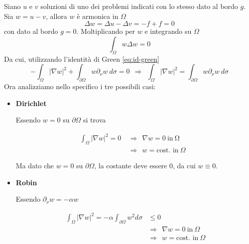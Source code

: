 \documentclass[10pt,a4paper,twoside,openright]{book}
\begin{document}
\begin{dimostrazione}
	Siano $\displaystyle u$ e $\displaystyle v$ soluzioni di uno dei problemi indicati con lo stesso dato al bordo $\displaystyle g$. Sia $\displaystyle w=u-v$, allora $\displaystyle w$ è armonica in $\displaystyle \Omega $
	\begin{equation*}
		\Delta w=\Delta u-\Delta v=-f+f=0
	\end{equation*}
	con dato al bordo $\displaystyle g=0$. Moltiplicando per $\displaystyle w$ e integrando su $\displaystyle \Omega $
	\begin{equation*}
		\int _{\Omega } w\Delta w=0
	\end{equation*}
	Da cui, utilizzando l'identità di Green \eqref{eq:id-green}
	\begin{equation*}
		-\int _{\Omega }| \nabla w| ^{2} +\int _{\partial \Omega } w\partial _{\nu } w\ d\sigma =0\ \ \Rightarrow \ \ \int _{\Omega }| \nabla w| ^{2} =\int _{\partial \Omega } w\partial _{\nu } w\ d\sigma 
	\end{equation*}
	Ora analizziamo nello specifico i tre possibili casi:
	\begin{itemize}
		\item \textbf{Dirichlet}
		      
		      Essendo $\displaystyle w=0$ su $\displaystyle \partial \Omega $ si trova
		      
		      \begin{align*}
		      	\int _{\Omega }| \nabla w| ^{2} =0\ &\Rightarrow \ \ \nabla w=0\ \text{in} \ \mathrm{\Omega } &                                                          \\
		      	                                      & \Rightarrow \ \ w=\text{cost. in} \ \Omega               
		      \end{align*}
		      
		      Ma dato che $\displaystyle w=0$ su $\displaystyle \partial \Omega $, la costante deve essere $\displaystyle 0$, da cui $\displaystyle w\equiv 0$.
		\item \textbf{Robin}
		      
		      Essendo $\displaystyle \partial _{\nu } w=-\alpha w$
		      
		      \begin{align*}
		      	\int _{\Omega }| \nabla w| ^{2} =-\alpha \int _{\partial \Omega } w^{2} d\sigma & \leqslant 0                                    \\
		      	                                                                                & \Rightarrow \ \ \nabla w=0\ \text{in} \ \Omega \\
		      	                                                                                & \Rightarrow \ \ w=\text{cost. in} \ \Omega     
		      \end{align*}
		      

\end{itemize}
\end{dimostrazione}
\end{document}

